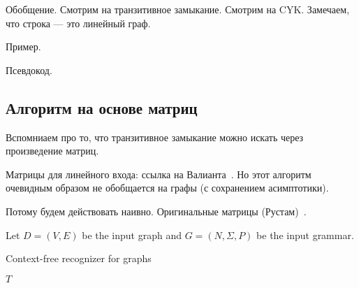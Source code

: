 Обобщение.
Смотрим на транзитивное замыкание.
Смотрим на CYK.
Замечаем, что строка --- это линейный граф.

\begin{example}
Пример.
\end{example}

Псевдокод.

\subsection{Алгоритм на основе матриц}

Вспомниаем про то, что транзитивное замыкание можно искать через произведение матриц.

Матрицы для линейного входа: ссылка на Валианта~\cite{!!!}.
Но этот алгоритм очевидным образом не обобщается на графы (с сохранением асимптотики).


Потому будем действовать наивно.
Оригинальные матрицы (Рустам)~\cite{Azimov:2018:CPQ:3210259.3210264}.

Let $D = (V, E)$ be the input graph and $G = (N,\Sigma,P)$ be the input grammar.

\begin{algorithm}[H]
\begin{algorithmic}[1]
\caption{Context-free recognizer for graphs}
\label{alg:graphParse}
    
    \EndFor    
       
    \EndWhile
\State \Return $T$
\EndFunction
\end{algorithmic}
\end{algorithm}


